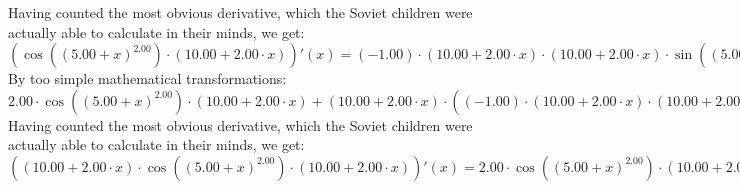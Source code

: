 \documentclass{article}
\begin{document}
 \newline
 \newline 
Having counted the most obvious derivative, which the Soviet children were actually able to calculate in their minds, we get:
$({ \cos {\left({\left({{5.00} + {x}}\right) ^ {2.00}}\right)}  \cdot \left({{10.00} + {{2.00} \cdot {x}}}\right)})'(x) = {{\left({-1.00}\right) \cdot {\left({{10.00} + {{2.00} \cdot {x}}}\right) \cdot {\left({{10.00} + {{2.00} \cdot {x}}}\right) \cdot  \sin {\left({\left({{5.00} + {x}}\right) ^ {2.00}}\right)} }}} + {{2.00} \cdot  \cos {\left({\left({{5.00} + {x}}\right) ^ {2.00}}\right)} }}$\newline
\newline
By too simple mathematical transformations:
 ${{{2.00} \cdot { \cos {\left({\left({{5.00} + {x}}\right) ^ {2.00}}\right)}  \cdot \left({{10.00} + {{2.00} \cdot {x}}}\right)}} + {\left({{10.00} + {{2.00} \cdot {x}}}\right) \cdot \left({{\left({-1.00}\right) \cdot {\left({{10.00} + {{2.00} \cdot {x}}}\right) \cdot {\left({{10.00} + {{2.00} \cdot {x}}}\right) \cdot  \sin {\left({\left({{5.00} + {x}}\right) ^ {2.00}}\right)} }}} + {{2.00} \cdot  \cos {\left({\left({{5.00} + {x}}\right) ^ {2.00}}\right)} }}\right)}} = {{{2.00} \cdot { \cos {\left({\left({{5.00} + {x}}\right) ^ {2.00}}\right)}  \cdot \left({{10.00} + {{2.00} \cdot {x}}}\right)}} + {\left({{10.00} + {{2.00} \cdot {x}}}\right) \cdot \left({{\left({-1.00}\right) \cdot {\left({{10.00} + {{2.00} \cdot {x}}}\right) \cdot {\left({{10.00} + {{2.00} \cdot {x}}}\right) \cdot  \sin {\left({\left({{5.00} + {x}}\right) ^ {2.00}}\right)} }}} + {{2.00} \cdot  \cos {\left({\left({{5.00} + {x}}\right) ^ {2.00}}\right)} }}\right)}}$ 
 \newline
 \newline 
Having counted the most obvious derivative, which the Soviet children were actually able to calculate in their minds, we get:
$({\left({{10.00} + {{2.00} \cdot {x}}}\right) \cdot { \cos {\left({\left({{5.00} + {x}}\right) ^ {2.00}}\right)}  \cdot \left({{10.00} + {{2.00} \cdot {x}}}\right)}})'(x) = {{{2.00} \cdot { \cos {\left({\left({{5.00} + {x}}\right) ^ {2.00}}\right)}  \cdot \left({{10.00} + {{2.00} \cdot {x}}}\right)}} + {\left({{10.00} + {{2.00} \cdot {x}}}\right) \cdot \left({{\left({-1.00}\right) \cdot {\left({{10.00} + {{2.00} \cdot {x}}}\right) \cdot {\left({{10.00} + {{2.00} \cdot {x}}}\right) \cdot  \sin {\left({\left({{5.00} + {x}}\right) ^ {2.00}}\right)} }}} + {{2.00} \cdot  \cos {\left({\left({{5.00} + {x}}\right) ^ {2.00}}\right)} }}\right)}}$\newline
\end{document}
